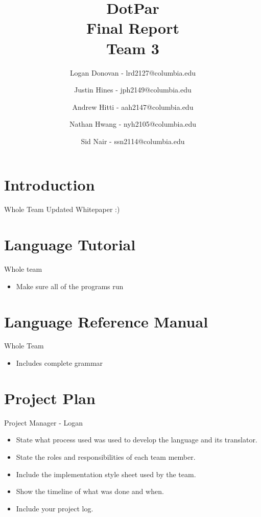 \documentclass[11pt]{article}
\begin{document}
\title{DotPar \\ Final Report \\ Team 3}
\author{
Logan Donovan - lrd2127@columbia.edu \and
Justin Hines - jph2149@columbia.edu \and
Andrew Hitti - aah2147@columbia.edu \and
Nathan Hwang - nyh2105@columbia.edu \and
Sid Nair - ssn2114@columbia.edu}
\maketitle

\section{Introduction}
Whole Team
Updated Whitepaper :)

\section{Language Tutorial}
Whole team
\begin{itemize}
\item Make sure all of the programs run
\end{itemize}


\section{Language Reference Manual}
Whole Team
\begin{itemize}
\item Includes complete grammar
\end{itemize}

\section{Project Plan}
Project Manager - Logan
\begin{itemize}
\item State what process used was used to develop the language and its translator.
\item State the roles and responsibilities of each team member.
\item Include the implementation style sheet used by the team.
\item Show the timeline of what was done and when.
\item Include your project log.
\end{itemize}
\end{document}
